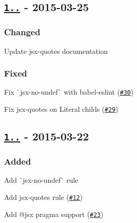 \subsection*{\href{https://github.com/yannickcr/eslint-plugin-react/compare/v1.6.0...v1.6.1}{\tt 1..} -\/ 2015-\/03-\/25}

\subsubsection*{Changed}


\begin{DoxyItemize}
\item Update {\ttfamily jsx-\/quotes} documentation
\end{DoxyItemize}

\subsubsection*{Fixed}


\begin{DoxyItemize}
\item Fix \`{}jsx-\/no-\/undef\`{} with {\ttfamily babel-\/eslint} (\href{https://github.com/yannickcr/eslint-plugin-react/issues/30}{\tt \#30})
\item Fix {\ttfamily jsx-\/quotes} on Literal childs (\href{https://github.com/yannickcr/eslint-plugin-react/issues/29}{\tt \#29})
\end{DoxyItemize}

\subsection*{\href{https://github.com/yannickcr/eslint-plugin-react/compare/v1.5.0...v1.6.0}{\tt 1..} -\/ 2015-\/03-\/22}

\subsubsection*{Added}


\begin{DoxyItemize}
\item Add \`{}jsx-\/no-\/undef\`{} rule
\item Add {\ttfamily jsx-\/quotes} rule (\href{https://github.com/yannickcr/eslint-plugin-react/issues/12}{\tt \#12})
\item Add {\ttfamily @jsx} pragma support (\href{https://github.com/yannickcr/eslint-plugin-react/issues/23}{\tt \#23})
\end{DoxyItemize}

